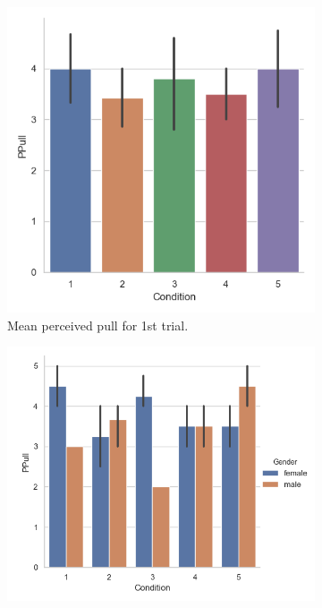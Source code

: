 \begin{figure}[H]
 \begin{subfigure}[b]{0.5\textwidth}
     \centering
     \includegraphics[scale=0.5]{Files/Plots/ppull_first_trial.png}
     \caption{Mean perceived pull for 1st trial.}
     \label{fig:meanPPull1st}
 \end{subfigure}
  \begin{subfigure}[b]{0.5\textwidth}
     \centering
     \includegraphics[scale=0.5]{Files/Plots/ppull_first_trial_gen.png}

\end{subfigure}
\end{figure}
